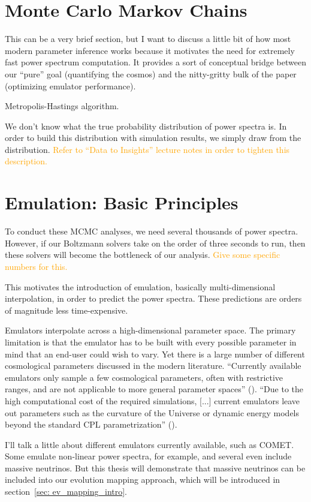 \section{Monte Carlo Markov Chains}

This can be a very brief section, but I want to discuss a little bit of how most modern parameter inference works because it motivates the need for extremely fast power spectrum computation. It provides a sort of conceptual bridge between our ``pure'' goal (quantifying the cosmos) and the nitty-gritty bulk of the paper (optimizing emulator performance).

Metropolis-Hastings algorithm.

We don't know what the true probability distribution of power spectra is. In order to build this distribution with simulation results, we simply draw from the distribution. \textcolor{orange}{Refer to ``Data to Insights'' lecture notes in order to tighten this description.}

\section{Emulation: Basic Principles}
\label{sec: emulation_intro}

To conduct these MCMC analyses, we need several thousands of power spectra. However, if our Boltzmann solvers take on the order of three seconds to run, then these solvers will become the bottleneck of our analysis. \textcolor{orange}{Give some specific numbers for this.}

This motivates the introduction of emulation, basically multi-dimensional interpolation, in order to predict the power spectra. These predictions are orders of magnitude less time-expensive. 

Emulators interpolate across a high-dimensional parameter space. The primary
limitation is that the emulator has to be built with every possible parameter
in mind that an end-user could wish to vary. Yet there is a large number of
different cosmological parameters discussed in the modern literature.
``Currently available emulators only sample a few cosmological parameters,
often with restrictive ranges, and are not applicable to more general
parameter
spaces'' (). ``Due to the high computational cost of the required
simulations, [...] current emulators leave out parameters such as the
curvature
of the Universe or dynamic energy models beyond the standard CPL
parametrization'' ().

I'll talk a little about different emulators currently available, such as COMET. Some emulate non-linear power spectra, for example, and several even include massive neutrinos. But this thesis will demonstrate that massive neutrinos can be included into our evolution mapping approach, which will be introduced in section~\ref{sec: ev_mapping_intro}.

